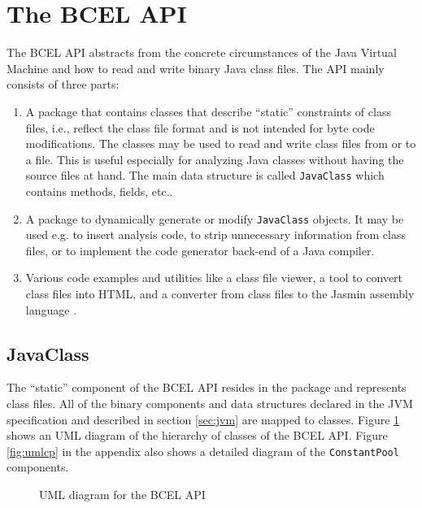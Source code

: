 \documentclass[12pt,twoside]{article}
\newcommand\jc{{\sffamily BCEL }}
\newcommand\jvm{{Java Virtual Machine }}
\begin{document}
\section{The BCEL API}\label{sec:api}

The \jc API abstracts from  the concrete circumstances of the \jvm and
how  to  read and  write  binary Java  class  files.   The API  mainly
consists of three parts:

\begin{enumerate}
  
\item A package that contains classes that describe ``static''
  constraints of class files, i.e., reflect the class file format and
  is not intended for byte code modifications.  The classes may be
  used to read and write class files from or to a file.  This is
  useful especially for analyzing Java classes without having the
  source files at hand.  The main data structure is called
  \texttt{JavaClass} which contains methods, fields, etc..

\item A  package to dynamically generate  or modify \texttt{JavaClass}
objects.  It  may be  used  e.g. to  insert  analysis  code, to  strip
unnecessary  information from class  files, or  to implement  the code
generator back-end of a Java compiler.

\item Various code examples and  utilities like a class file viewer, a
tool  to convert class  files into  HTML, and  a converter  from class
files to the Jasmin assembly language \cite{jasmin}.
\end{enumerate}

\subsection{JavaClass}\label{sec:javaclass}

The  ``static''  component of  the  \jc  API  resides in  the  package
 and represents class files.  All of the
binary   components  and   data   structures  declared   in  the   JVM
specification  \cite{jvm} and described  in section  \ref{sec:jvm} are
mapped to classes.  Figure \ref{fig:umljc} shows an UML diagram of the
hierarchy of  classes of the  \jc API.  Figure \ref{fig:umlcp}  in the
appendix also  shows a  detailed diagram of  the \texttt{ConstantPool}
components.

\begin{figure}[htbp]
  \begin{center}
    \leavevmode 
    \textheight
    \caption{UML diagram for the \jc API}\label{fig:umljc}
  \end{center}
\end{figure}
\end{document}
